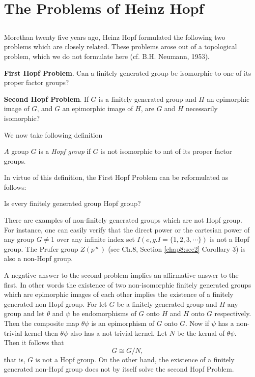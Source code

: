 
\chapter{The Problems of Heinz Hopf}\label{chap12} %

\section{}\label{chap12:sec1} %

More\pageoriginale than  twenty five years ago, Heinz Hopf formulated
the following 
two problems which are closely related. These problems arose out of a
topological problem, which we do not formulate here  (cf. B.H. Neumann,
1953). 

\noindent\textbf{First Hopf Problem}. Can a finitely generated group be
isomorphic to one of its proper factor groups? 

\noindent\textbf{Second Hopf Problem}. If $G$ is a finitely generated group and
$H$ an epimorphic image of $G$, and $G$ an epimorphic image of $H$,
are $G$ and $H$ necessarily isomorphic? 

We now take following definition
\begin{defi*}
  $A$ group $G$ is a \textit{Hopf group} if $G$ is not isomorphic to
  ant of its proper factor groups. 
\end{defi*}

In virtue of this definition, the First Hopf Problem can be
reformulated as follows: 

Is every finitely generated group  Hopf group?

There are examples of non-finitely generated groups which are not Hopf
group. For instance, one can easily verify  that the direct power or
the cartesian  power of any group $G \neq 1$ over any infinite index
set $I (e,g. I= \{ 1,2,3, \cdots\})$ is not a Hopf group. The Prufer
group $Z (p^{\infty})$ (see Ch.8, Section \ref{chap8:sec2} Corollary 3) is\pageoriginale
also a non-Hopf group. 

A negative answer to the second problem implies an affirmative answer
to the first. In other words the existence of two non-isomorphic
finitely generated groups which are epimorphic images of each other
implies  the existence of a finitely generated non-Hopf group. For let
$G$ be a finitely generated group and $H$ any group and let $\theta$
and $\psi$ be endomorphisms of $G$ onto $H$ and $H$ onto $G$
respectively. Then the composite map $\theta \psi$ is an epimorphism
of $G$ onto $G$. Now if $\psi$ has a non-trivial kernel  then $\theta
\psi$ also has a not-trivial kernel. Let $N$ be the kernal of $\theta
\psi$. Then it follows that  
$$
G \cong G/N, 
$$   
that is, $G$ is not a Hopf group. On the other hand, the existence of
a finitely generated non-Hopf group does not by itself solve the
second Hopf Problem. 

